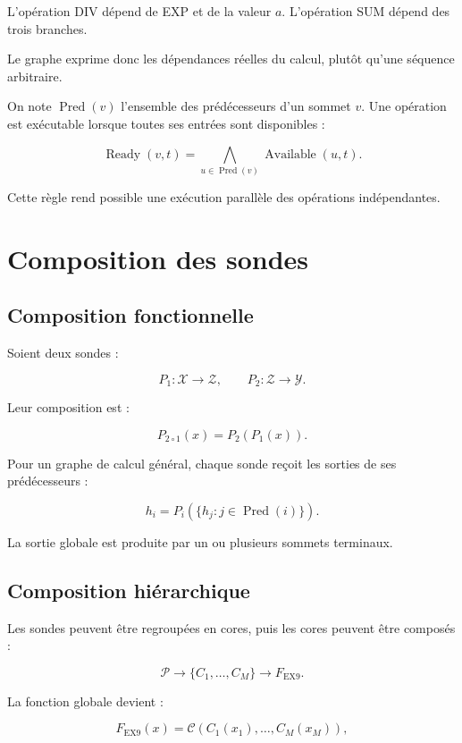 \documentclass[11pt,a4paper]{article}
\begin{document}
L'opération DIV dépend de EXP et de la valeur $a$.
L'opération SUM dépend des trois branches.

Le graphe exprime donc les dépendances réelles du calcul, plutôt
qu'une séquence arbitraire.

On note $\operatorname{Pred}(v)$ l'ensemble des prédécesseurs d'un
sommet $v$. Une opération est exécutable lorsque toutes ses entrées
sont disponibles :

\[
\operatorname{Ready}(v,t)
=
\bigwedge_{u\in\operatorname{Pred}(v)}
\operatorname{Available}(u,t).
\]

Cette règle rend possible une exécution parallèle des opérations
indépendantes.

\section{Composition des sondes}

\subsection{Composition fonctionnelle}

Soient deux sondes :

\[
P_1:\mathcal{X}\rightarrow\mathcal{Z},
\qquad
P_2:\mathcal{Z}\rightarrow\mathcal{Y}.
\]

Leur composition est :

\[
P_{2\circ1}(x)=P_2(P_1(x)).
\]

Pour un graphe de calcul général, chaque sonde reçoit les sorties
de ses prédécesseurs :

\[
h_i
=
P_i
\left(
\{h_j:j\in\operatorname{Pred}(i)\}
\right).
\]

La sortie globale est produite par un ou plusieurs sommets terminaux.

\subsection{Composition hiérarchique}

Les sondes peuvent être regroupées en cores, puis les cores peuvent
être composés :

\[
\mathcal{P}
\longrightarrow
\{C_1,\ldots,C_M\}
\longrightarrow
F_{\mathrm{EX9}}.
\]

La fonction globale devient :

\[
F_{\mathrm{EX9}}(x)
=
\mathcal{C}
\left(
C_1(x_1),\ldots,C_M(x_M)
\right),
\]
\end{document}
